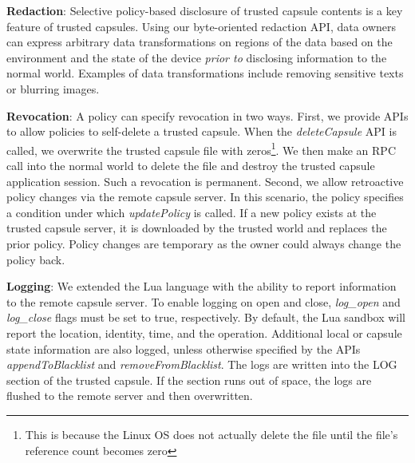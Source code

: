 \textbf{Redaction}: Selective policy-based disclosure of trusted capsule
contents is a key feature of trusted capsules. Using our byte-oriented
redaction API, data owners can express arbitrary data
transformations on regions of the data based on the environment and
the state of the device \emph{prior to} disclosing information to the normal world.  Examples
of data transformations include removing sensitive texts or blurring
images. %

\textbf{Revocation}: A policy can specify revocation in two 
ways. First, we provide APIs to allow policies to self-delete a trusted
capsule. When the \textit{deleteCapsule} API is called, we overwrite
the trusted capsule file with zeros\footnote{This is because the Linux OS does not
actually delete the file until the file's reference count becomes zero}. We then
make an RPC call into the normal world to delete the file and destroy the
trusted capsule application session. Such a revocation is permanent.  Second, we
allow retroactive policy changes via the remote capsule server. In this
scenario, the policy specifies a condition under which \textit{updatePolicy} is
called. If a new policy exists at the trusted capsule server, it is downloaded
by the trusted world and replaces the prior policy. Policy changes are temporary as the owner
could always change the policy back. %

\textbf{Logging}: We extended the Lua language with the ability to report
information to the remote capsule server. To enable logging on open and close, \textit{log\_open}
and \textit{log\_close} flags must be set to true, respectively.
By default, the Lua sandbox will report the location,
identity, time, and the operation. Additional local or capsule state information are
also logged, unless otherwise specified by the APIs \textit{appendToBlacklist}
and \textit{removeFromBlacklist}. The logs are written into the LOG section of
the trusted capsule.  If the section runs out of space, the logs are flushed to
the remote server and then overwritten. %


